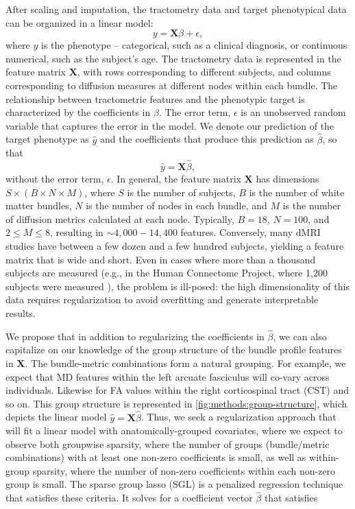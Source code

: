 \documentclass[10pt,letterpaper]{article}
\begin{document}
After scaling and imputation, the tractometry data and target
phenotypical data can be organized in a linear model:
\begin{equation}
    y = \mathbf{X} \beta + \epsilon,
    \label{eq:lm}
\end{equation}
where $y$ is the phenotype -- categorical, such as a clinical diagnosis,
or continuous numerical, such as the subject's age. The tractometry
data is represented in the feature matrix $\mathbf{X}$, with rows
corresponding to different subjects, and columns corresponding
to diffusion measures at different nodes within each bundle. The
relationship between tractometric features and the phenotypic target is
characterized by the coefficients in $\beta$. The error term, $\epsilon$
is an unobserved random variable that captures the error in the model.
We denote our prediction of the target phenotype as $\hat{y}$ and the
coefficients that produce this prediction as $\hat{\beta}$, so that
\begin{equation}
    \hat{y} = \mathbf{X} \hat{\beta},
    \label{eq:lm-approx}
\end{equation}
without the error term, $\epsilon$. In general, the feature matrix
$\mathbf{X}$ has dimensions $S \times (B \times N \times M)$, where $S$
is the number of subjects, $B$ is the number of white matter bundles,
$N$ is the number of nodes in each bundle, and $M$ is the number of
diffusion metrics calculated at each node. Typically, $B = 18$, $N =
100$, and $2 \le M \le 8$, resulting in $\sim 4,000 - 14,400$ features.
Conversely, many dMRI studies have between a few dozen and a few
hundred subjects, yielding a feature matrix that is wide and short.
Even in cases where more than a thousand subjects are measured (e.g.,
in the Human Connectome Project, where 1,200 subjects were measured
\cite{VanEssen2012}), the problem is ill-posed: the high dimensionality
of this data requires regularization to avoid overfitting and generate
interpretable results.

We propose that in addition to regularizing the coefficients in
$\hat{\beta}$, we can also capitalize on our knowledge of the group structure
of the bundle profile features in $\mathbf{X}$. The bundle-metric
combinations form a natural grouping. For example, we expect that MD features
within the left arcuate fasciculus will co-vary across individuals. Likewise
for FA values within the right corticospinal tract (CST) and so on. This
group structure is represented in \cref{fig:methods:group-structure}, which
depicts the linear model $\hat{y} = \mathbf{X} \hat{\beta}$. Thus, we seek a
regularization approach that will fit a linear model with
anatomically-grouped covariates, where we expect to observe both groupwise
sparsity, where the number of groups (bundle/metric combinations) with at
least one non-zero coefficients is small, as well as within-group sparsity,
where the number of non-zero coefficients within each non-zero group is
small. The sparse group lasso (SGL) is a penalized regression technique that
satisfies these criteria\cite{simon2013sparse}. It solves for a
coefficient vector $\hat{\beta}$ that satisfies
\end{document}
